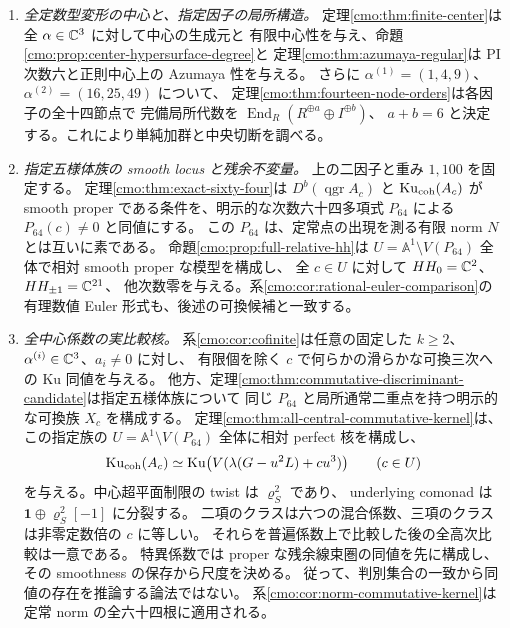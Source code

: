 \begin{enumerate}
 \item \emph{全定数型変形の中心と、指定因子の局所構造。}
 定理\ref{cmo:thm:finite-center}は全 $\alpha\in\mathbb C^3$ に対して中心の生成元と
 有限中心性を与え、命題\ref{cmo:prop:center-hypersurface-degree}と
 定理\ref{cmo:thm:azumaya-regular}は PI 次数六と正則中心上の Azumaya 性を与える。
 さらに $\alpha^{(1)}=(1,4,9)$、$\alpha^{(2)}=(16,25,49)$ について、
 定理\ref{cmo:thm:fourteen-node-orders}は各因子の全十四節点で
 完備局所代数を $\operatorname{End}_R(R^{\oplus a}\oplus I^{\oplus b})$、
 $a+b=6$ と決定する。これにより単純加群と中央切断を調べる。

 \item \emph{指定五様体族の smooth locus と残余不変量。}
 上の二因子と重み $1,100$ を固定する。
 定理\ref{cmo:thm:exact-sixty-four}は
 $D^b(\operatorname{qgr}A_c)$ と $\operatorname{Ku}_{\mathrm{coh}}(A_c)$ が
 smooth proper である条件を、明示的な次数六十四多項式 $P_{64}$ による
 $P_{64}(c)\ne0$ と同値にする。
 この $P_{64}$ は、定常点の出現を測る有限 norm $N$ とは互いに素である。
 命題\ref{cmo:prop:full-relative-hh}は
 $U=\mathbb A^1\setminus V(P_{64})$ 全体で相対 smooth proper な模型を構成し、
 全 $c\in U$ に対して $HH_0=\mathbb C^2$、$HH_{\pm1}=\mathbb C^{21}$、
 他次数零を与える。系\ref{cmo:cor:rational-euler-comparison}の
 有理数値 Euler 形式も、後述の可換候補と一致する。

 \item \emph{全中心係数の実比較核。}
 系\ref{cmo:cor:cofinite}は任意の固定した
 $k\ge2$、$\alpha^{(i)}\in\mathbb C^3$、$a_i\ne0$ に対し、
 有限個を除く $c$ で何らかの滑らかな可換三次への Ku 同値を与える。
 他方、定理\ref{cmo:thm:commutative-discriminant-candidate}は指定五様体族について
 同じ $P_{64}$ と局所通常二重点を持つ明示的な可換族 $X_c$ を構成する。
 定理\ref{cmo:thm:all-central-commutative-kernel}は、この指定族の
 $U=\mathbb A^1\setminus V(P_{64})$ 全体に相対 perfect 核を構成し、
 \[
   \operatorname{Ku}_{\mathrm{coh}}(A_c)\simeq
   \operatorname{Ku}\bigl(V(\lambda(G-u^2L)+cu^3)\bigr)
       \qquad(c\in U)
 \]
 を与える。中心超平面制限の twist は $\varrho_S^2$ であり、
 underlying comonad は $\mathbf1\oplus\varrho_S^2[-1]$ に分裂する。
 二項のクラスは六つの混合係数、三項のクラスは非零定数倍の $c$ に等しい。
 それらを普遍係数上で比較した後の全高次比較は一意である。
 特異係数では proper な残余線束圏の同値を先に構成し、
 その smoothness の保存から尺度を決める。
 従って、判別集合の一致から同値の存在を推論する論法ではない。
 系\ref{cmo:cor:norm-commutative-kernel}は定常 norm の全六十四根に適用される。


\end{enumerate}
